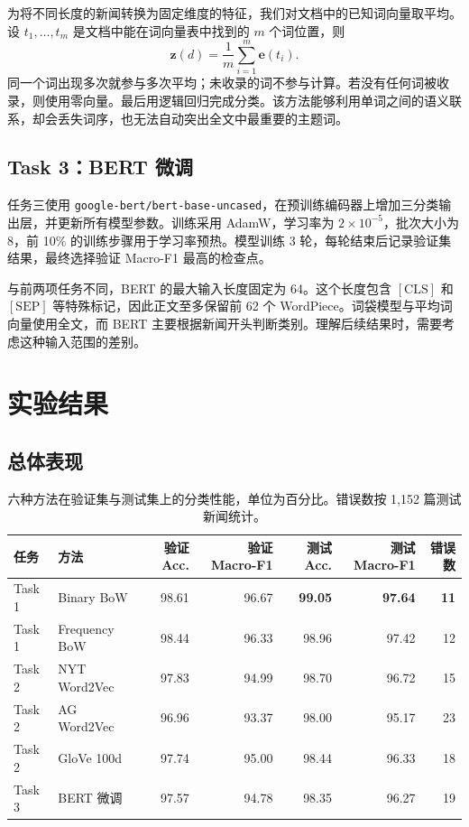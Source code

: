 \documentclass[11pt]{article}
\newcommand{\code}[1]{\texttt{\small #1}}
\begin{document}
为将不同长度的新闻转换为固定维度的特征，我们对文档中的已知词向量取平均。设 $t_1,\ldots,t_m$ 是文档中能在词向量表中找到的 $m$ 个词位置，则
\begin{equation}
\mathbf z(d)=\frac{1}{m}\sum_{i=1}^{m}\mathbf e(t_i).
\label{eq:pool}
\end{equation}
同一个词出现多次就参与多次平均；未收录的词不参与计算。若没有任何词被收录，则使用零向量。最后用逻辑回归完成分类。该方法能够利用单词之间的语义联系，却会丢失词序，也无法自动突出全文中最重要的主题词。

\subsection{Task 3：BERT 微调}

任务三使用 \code{google-bert/bert-base-uncased}，在预训练编码器上增加三分类输出层，并更新所有模型参数\citep{devlin-etal-2019-bert}。训练采用 AdamW，学习率为 $2\times10^{-5}$，批次大小为 8，前 10\% 的训练步骤用于学习率预热。模型训练 3 轮，每轮结束后记录验证集结果，最终选择验证 Macro-F1 最高的检查点。

与前两项任务不同，BERT 的最大输入长度固定为 64。这个长度包含 $\mathrm{[CLS]}$ 和 $\mathrm{[SEP]}$ 等特殊标记，因此正文至多保留前 62 个 WordPiece。词袋模型与平均词向量使用全文，而 BERT 主要根据新闻开头判断类别。理解后续结果时，需要考虑这种输入范围的差别。

\section{实验结果}

\subsection{总体表现}

\begin{table}[t]
\centering\small
\begin{tabular}{llrrrrr}
\toprule
任务 & 方法 & 验证 Acc. & 验证 Macro-F1 & 测试 Acc. & 测试 Macro-F1 & 错误数\\
\midrule
Task 1 & Binary BoW & 98.61 & 96.67 & \textbf{99.05} & \textbf{97.64} & \textbf{11}\\
Task 1 & Frequency BoW & 98.44 & 96.33 & 98.96 & 97.42 & 12\\
Task 2 & NYT Word2Vec & 97.83 & 94.99 & 98.70 & 96.72 & 15\\
Task 2 & AG Word2Vec & 96.96 & 93.37 & 98.00 & 95.17 & 23\\
Task 2 & GloVe 100d & 97.74 & 95.00 & 98.44 & 96.33 & 18\\
Task 3 & BERT 微调 & 97.57 & 94.78 & 98.35 & 96.27 & 19\\
\bottomrule
\end{tabular}
\caption{六种方法在验证集与测试集上的分类性能，单位为百分比。错误数按 1,152 篇测试新闻统计。}
\label{tab:main}
\end{table}
\end{document}
